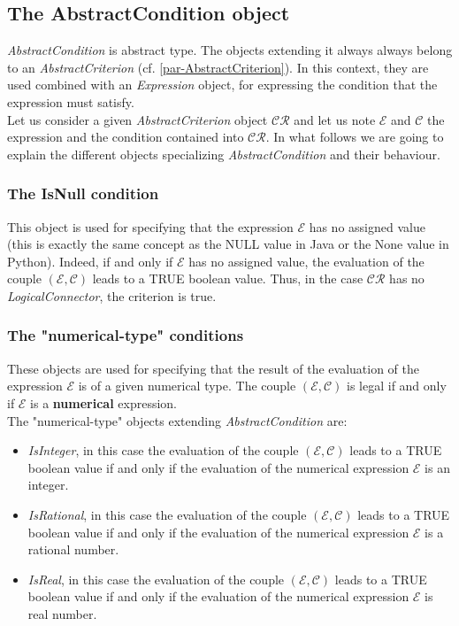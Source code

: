 \documentclass[a4paper,11pt] {article}
\begin{document}
\subsection{The AbstractCondition object}\label{par-ConditionType}
{\it AbstractCondition} is abstract type. The objects extending it always always belong to an  {\it  AbstractCriterion} (cf. \ref{par-AbstractCriterion}). In this context, they are used combined with an {\it Expression} object, for expressing the condition that the expression must satisfy.\\ 
Let us consider a given {\it AbstractCriterion} object $\mathcal{CR}$ and let us note $\mathcal E$ and
$\mathcal C$ the expression and the condition contained into $\mathcal{CR}$.
In what follows we are going to explain the different objects specializing  {\it AbstractCondition} and their behaviour.

\subsubsection{The IsNull condition}
This object is used for specifying that the expression $\mathcal E$ has no assigned value (this is exactly the same concept as the NULL value in Java or the None value in Python). 
Indeed, if and only if $\mathcal E$ has no assigned value, the evaluation of the couple $(\mathcal E, \mathcal C)$ leads to a TRUE boolean value. Thus, in the case $\mathcal{CR}$ has no {\it LogicalConnector}, the criterion is true.



\subsubsection{The "numerical-type" conditions}
These objects are used for specifying that the result of the evaluation of the expression $\mathcal E$ is of a given numerical type. The couple $(\mathcal E, \mathcal C)$ is legal if and only if $\mathcal E$ is a {\bf numerical} expression. \\
The "numerical-type" objects extending {\it AbstractCondition}  are:
\begin{itemize}
\item {\it IsInteger}, in this case the evaluation of the couple $(\mathcal E, \mathcal C)$ leads to a TRUE boolean value
if and only if the evaluation of the numerical expression $\mathcal E$ is an integer.
\item {\it IsRational}, in this case the evaluation of the couple $(\mathcal E, \mathcal C)$ leads to a TRUE boolean value if and only if the evaluation of the numerical expression $\mathcal E$ is a rational number.
\item {\it IsReal}, in this case the evaluation of the couple $(\mathcal E, \mathcal C)$ leads to a TRUE boolean value
if and only if the evaluation of the numerical expression $\mathcal E$ is real number.
\end{itemize} 
\end{document}
